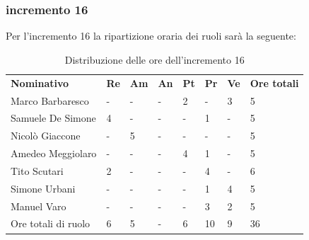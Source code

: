 \subsubsection{incremento 16}
Per l'incremento 16 la ripartizione oraria dei ruoli sarà la seguente:
\begin{center}
    \begin{table}[ht!]
        \centering
        \caption{Distribuzione delle ore dell'incremento 16}
        \vspace{5px}
        \renewcommand{\arraystretch}{1.8}
        \begin{tabular}{p{100px} p{20px} p{20px} p{20px} p{20px} p{20px} p{20px} p{50px} }
            \rowcolor{logo!70} \textbf{Nominativo} & \textbf{Re} & \textbf{Am} & \textbf{An} & \textbf{Pt} & \textbf{Pr} & \textbf{Ve} & \textbf{Ore totali} \\
            Marco Barbaresco                       & -           & -           & -           & 2           & -           & 3           & 5                   \\
            Samuele De Simone                      & 4           & -           & -           & -           & 1           & -           & 5                   \\
            Nicolò Giaccone                        & -           & 5           & -           & -           & -           & -           & 5                   \\
            Amedeo Meggiolaro                      & -           & -           & -           & 4           & 1           & -           & 5                   \\
            Tito Scutari                           & 2           & -           & -           & -           & 4           & -           & 6                   \\
            Simone Urbani                          & -           & -           & -           & -           & 1           & 4           & 5                   \\
            Manuel Varo                            & -           & -           & -           & -           & 3           & 2           & 5                   \\
            Ore totali di ruolo                    & 6           & 5           & -           & 6           & 10          & 9           & 36                  \\
        \end{tabular}
    \end{table}
\end{center}
